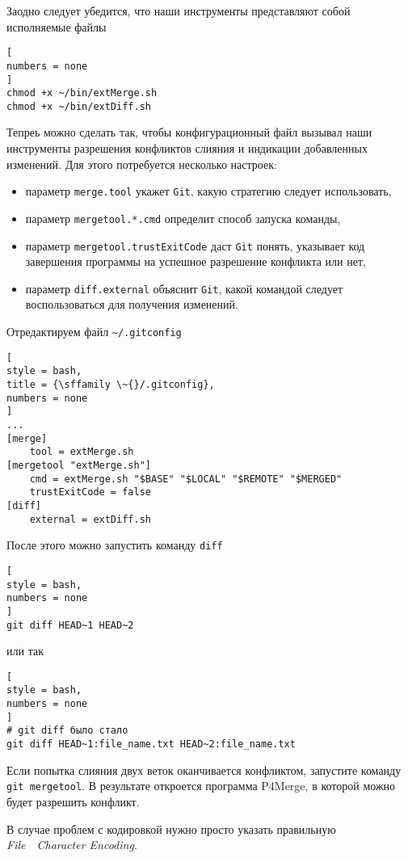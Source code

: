 \documentclass[%
	11pt,
	a4paper,
	utf8,
		]{article}
\begin{document}
Заодно следует убедится, что наши инструменты представляют собой исполняемые файлы
\begin{lstlisting}[
numbers = none
]
chmod +x ~/bin/extMerge.sh
chmod +x ~/bin/extDiff.sh
\end{lstlisting}

Тепреь можно сделать так, чтобы конфигурационный файл вызывал наши инструменты разрешения конфликтов слияния и индикации добавленных изменений. Для этого потребуется несколько настроек:
\begin{itemize}
	\item параметр \verb|merge.tool| укажет \texttt{Git}, какую стратегию следует использовать,
	
	\item параметр \verb|mergetool.*.cmd| определит способ запуска команды,
	
	\item параметр \verb|mergetool.trustExitCode| даст \texttt{Git} понять, указывает код завершения программы на успешное разрешение конфликта или нет, 
	
	\item параметр \texttt{diff.external} объяснит \texttt{Git}, какой командой  следует воспользоваться для получения изменений.
\end{itemize}

Отредактируем файл \verb|~/.gitconfig|
\begin{lstlisting}[
style = bash,
title = {\sffamily \~{}/.gitconfig},
numbers = none
]
...
[merge]
    tool = extMerge.sh
[mergetool "extMerge.sh"]
    cmd = extMerge.sh "$BASE" "$LOCAL" "$REMOTE" "$MERGED"
    trustExitCode = false
[diff]
    external = extDiff.sh
\end{lstlisting}

После этого можно запустить команду \texttt{diff} 
\begin{lstlisting}[
style = bash,
numbers = none
]
git diff HEAD~1 HEAD~2
\end{lstlisting}
или так 
\begin{lstlisting}[
style = bash,
numbers = none
]
# git diff было стало
git diff HEAD~1:file_name.txt HEAD~2:file_name.txt
\end{lstlisting}

Если попытка слияния двух веток оканчивается конфликтом, запустите команду \texttt{git mergetool}. В результате откроется программа P4Merge, в которой можно будет разрешить конфликт.

В случае проблем с кодировкой нужно просто указать правильную \textit{File}~\textrightarrow~\textit{Character Encoding}.
\end{document}
